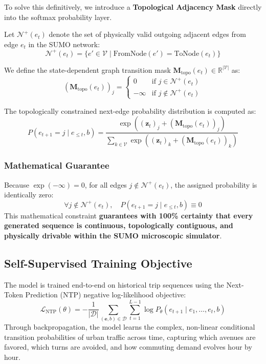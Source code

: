 \documentclass[12pt,a4paper]{article}
\begin{document}
To solve this definitively, we introduce a \textbf{Topological Adjacency Mask} directly into the softmax probability layer.

Let $\mathcal{N}^+(e_t)$ denote the set of physically valid outgoing adjacent edges from edge $e_t$ in the SUMO network:
\begin{equation}
\mathcal{N}^+(e_t) = \{ e' \in \mathcal{V} \mid \text{FromNode}(e') = \text{ToNode}(e_t) \}
\end{equation}

We define the state-dependent graph transition mask $\mathbf{M}_{\text{topo}}(e_t) \in \mathbb{R}^{|\mathcal{V}|}$ as:
\begin{equation}
(\mathbf{M}_{\text{topo}}(e_t))_j = \begin{cases} 
0 & \text{if } j \in \mathcal{N}^+(e_t) \\
-\infty & \text{if } j \notin \mathcal{N}^+(e_t)
\end{cases}
\end{equation}

The topologically constrained next-edge probability distribution is computed as:
\begin{equation}
P(e_{t+1} = j \mid e_{\le t}, b) = \frac{\exp\left( (\mathbf{z}_t)_j + (\mathbf{M}_{\text{topo}}(e_t))_j \right)}{\sum_{k \in \mathcal{V}} \exp\left( (\mathbf{z}_t)_k + (\mathbf{M}_{\text{topo}}(e_t))_k \right)}
\end{equation}

\subsubsection{Mathematical Guarantee}
Because $\exp(-\infty) = 0$, for all edges $j \notin \mathcal{N}^+(e_t)$, the assigned probability is identically zero:
\begin{equation}
\forall j \notin \mathcal{N}^+(e_t), \quad P(e_{t+1} = j \mid e_{\le t}, b) \equiv 0
\end{equation}
This mathematical constraint \textbf{guarantees with 100\% certainty that every generated sequence is continuous, topologically contiguous, and physically drivable within the SUMO microscopic simulator}.

\subsection{Self-Supervised Training Objective}
The model is trained end-to-end on historical trip sequences using the Next-Token Prediction (NTP) negative log-likelihood objective:
\begin{equation}
\mathcal{L}_{\text{NTP}}(\theta) = - \frac{1}{|\mathcal{D}|} \sum_{(\mathbf{e}, b) \in \mathcal{D}} \sum_{t=1}^{L-1} \log P_\theta(e_{t+1} \mid e_1, \dots, e_t, b)
\end{equation}
Through backpropagation, the model learns the complex, non-linear conditional transition probabilities of urban traffic across time, capturing which avenues are favored, which turns are avoided, and how commuting demand evolves hour by hour.
\end{document}
